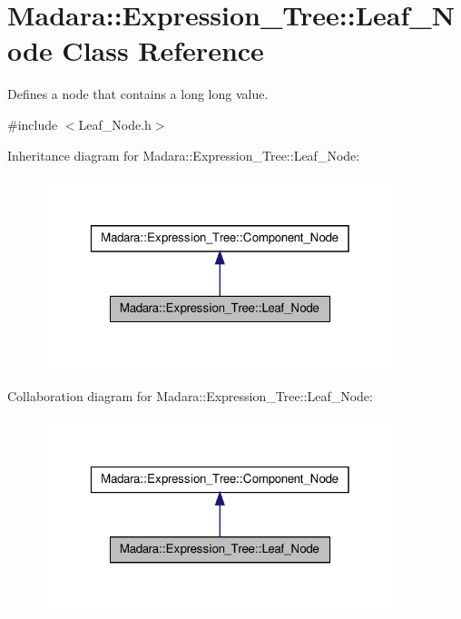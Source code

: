 \hypertarget{classMadara_1_1Expression__Tree_1_1Leaf__Node}{
\section{Madara::Expression\_\-Tree::Leaf\_\-Node Class Reference}
\label{de/de4/classMadara_1_1Expression__Tree_1_1Leaf__Node}
}


Defines a node that contains a long long value.  




{\ttfamily \#include $<$Leaf\_\-Node.h$>$}



Inheritance diagram for Madara::Expression\_\-Tree::Leaf\_\-Node:
\nopagebreak
\begin{figure}[H]
\begin{center}
\leavevmode
\includegraphics[width=292pt]{db/d5b/classMadara_1_1Expression__Tree_1_1Leaf__Node__inherit__graph}
\end{center}
\end{figure}


Collaboration diagram for Madara::Expression\_\-Tree::Leaf\_\-Node:
\nopagebreak
\begin{figure}[H]
\begin{center}
\leavevmode
\includegraphics[width=292pt]{d1/d3c/classMadara_1_1Expression__Tree_1_1Leaf__Node__coll__graph}
\end{center}
\end{figure}
